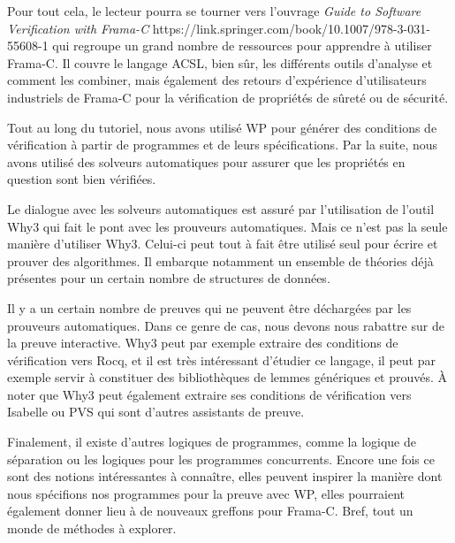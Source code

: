 Pour tout cela, le lecteur pourra se tourner vers l'ouvrage
\externalLink
{\textit{Guide to Software Verification with Frama-C }}
{https://link.springer.com/book/10.1007/978-3-031-55608-1}
qui regroupe un grand nombre de ressources pour apprendre à utiliser Frama-C.
Il couvre le langage ACSL, bien sûr, les différents outils d'analyse et comment
les combiner, mais également des retours d'expérience d'utilisateurs industriels
de Frama-C pour la vérification de propriétés de sûreté ou de sécurité.




Tout au long du tutoriel, nous avons utilisé WP pour générer des conditions de
vérification à partir de programmes et de leurs spécifications. Par la suite,
nous avons utilisé des solveurs automatiques pour assurer que les propriétés en
question sont bien vérifiées.



Le dialogue avec les solveurs automatiques est assuré par l'utilisation de
l'outil Why3 qui fait le pont avec les prouveurs automatiques. Mais ce n'est pas
la seule manière d'utiliser Why3. Celui-ci peut tout à fait être utilisé seul
pour écrire et prouver des algorithmes. Il embarque notamment un ensemble de
théories déjà présentes pour un certain nombre de structures de données.



Il y a un certain nombre de preuves qui ne peuvent être déchargées par les
prouveurs automatiques. Dans ce genre de cas, nous devons nous rabattre sur de
la preuve interactive. Why3 peut par exemple extraire des conditions de
vérification vers Rocq, et il est très intéressant d'étudier ce langage, il peut
par exemple servir à constituer des bibliothèques de lemmes génériques et
prouvés. À noter que Why3 peut également extraire ses conditions de vérification
vers Isabelle ou PVS qui sont d'autres assistants de preuve.



Finalement, il existe d'autres logiques de programmes, comme la logique de
séparation ou les logiques pour les programmes concurrents. Encore une fois ce
sont des notions intéressantes à connaître, elles peuvent inspirer la manière dont
nous spécifions nos programmes pour la preuve avec WP, elles pourraient également
donner lieu à de nouveaux greffons pour Frama-C. Bref, tout un monde de méthodes à
explorer.
